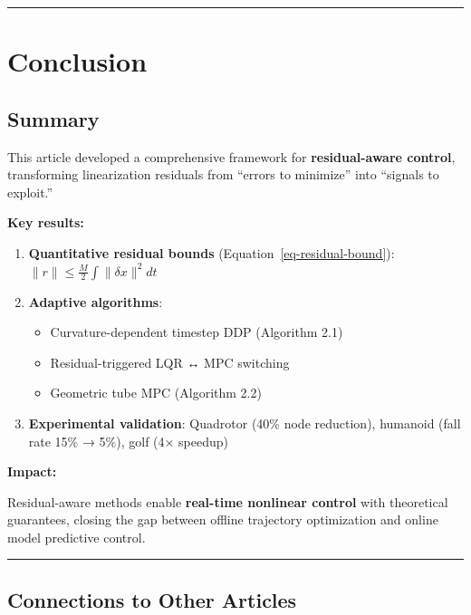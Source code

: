\documentclass[
  letterpaper,
  DIV=11,
  numbers=noendperiod]{scrartcl}
\providecommand{\tightlist}{%
  \setlength{\itemsep}{0pt}\setlength{\parskip}{0pt}}\usepackage{longtable,booktabs,array}
\begin{document}
\begin{center}\rule{0.5\linewidth}{0.5pt}\end{center}

\section{Conclusion}\label{sec-conclusion}

\subsection{Summary}\label{summary}

This article developed a comprehensive framework for
\textbf{residual-aware control}, transforming linearization residuals
from ``errors to minimize'' into ``signals to exploit.''

\textbf{Key results:}

\begin{enumerate}
\def\labelenumi{\arabic{enumi}.}
\tightlist
\item
  \textbf{Quantitative residual bounds}
  (Equation~\ref{eq-residual-bound}):
  \(\|r\| \leq \frac{M}{2} \int \|\delta x\|^2 dt\)
\item
  \textbf{Adaptive algorithms}:

  \begin{itemize}
  \tightlist
  \item
    Curvature-dependent timestep DDP (Algorithm 2.1)
  \item
    Residual-triggered LQR ↔ MPC switching
  \item
    Geometric tube MPC (Algorithm 2.2)
  \end{itemize}
\item
  \textbf{Experimental validation}: Quadrotor (40\% node reduction),
  humanoid (fall rate 15\% → 5\%), golf (4× speedup)
\end{enumerate}

\textbf{Impact:}

Residual-aware methods enable \textbf{real-time nonlinear control} with
theoretical guarantees, closing the gap between offline trajectory
optimization and online model predictive control.

\begin{center}\rule{0.5\linewidth}{0.5pt}\end{center}

\subsection{Connections to Other
Articles}\label{connections-to-other-articles}
\end{document}
